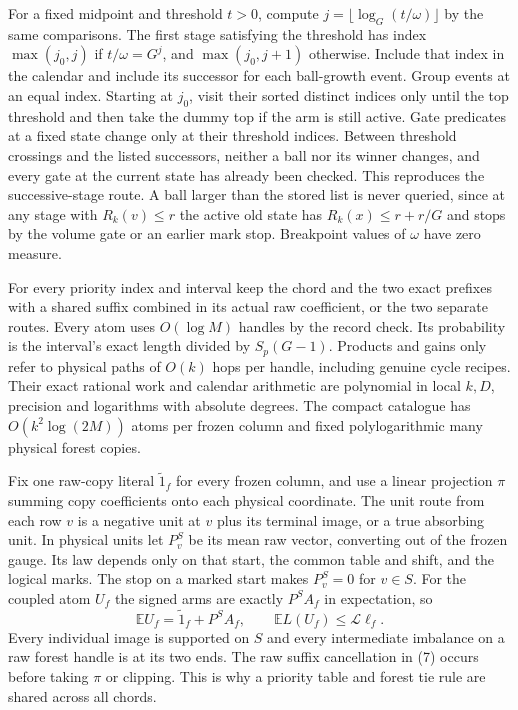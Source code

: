 \documentclass[11pt]{article}
\begin{document}
For a fixed midpoint and threshold \(t>0\), compute \(j=\lfloor\log_G(t/\omega)\rfloor\) by the same comparisons. The first stage satisfying the threshold has index \(\max(j_0,j)\) if \(t/\omega=G^j\), and \(\max(j_0,j+1)\) otherwise. Include that index in the calendar and include its successor for each ball-growth event. Group events at an equal index. Starting at \(j_0\), visit their sorted distinct indices only until the top threshold and then take the dummy top if the arm is still active. Gate predicates at a fixed state change only at their threshold indices. Between threshold crossings and the listed successors, neither a ball nor its winner changes, and every gate at the current state has already been checked. This reproduces the successive-stage route. A ball larger than the stored list is never queried, since at any stage with \(R_k(v)\le r\) the active old state has \(R_k(x)\le r+r/G\) and stops by the volume gate or an earlier mark stop. Breakpoint values of \(\omega\) have zero measure.

For every priority index and interval keep the chord and the two exact prefixes with a shared suffix combined in its actual raw coefficient, or the two separate routes. Every atom uses \(O(\log M)\) handles by the record check. Its probability is the interval's exact length divided by \(S_p(G-1)\). Products and gains only refer to physical paths of \(O(k)\) hops per handle, including genuine cycle recipes. Their exact rational work and calendar arithmetic are polynomial in local \(k,D\), precision and logarithms with absolute degrees. The compact catalogue has \(O(k^2\log(2M))\) atoms per frozen column and fixed polylogarithmic many physical forest copies.

Fix one raw-copy literal \(\widetilde{1}_f\) for every frozen column, and use a linear projection \(\pi\) summing copy coefficients onto each physical coordinate. The unit route from each row \(v\) is a negative unit at \(v\) plus its terminal image, or a true absorbing unit. In physical units let \(P^S_v\) be its mean raw vector, converting out of the frozen gauge. Its law depends only on that start, the common table and shift, and the logical marks. The stop on a marked start makes \(P^S_v=0\) for \(v\in S\). For the coupled atom \(U_f\) the signed arms are exactly \(P^S A_f\) in expectation, so
\[
   \mathbb E U_f=\widetilde{1}_f+P^S A_f,
   \qquad
   \mathbb E L(U_f)\le\mathcal L\ell_f .
\tag{7}
\]
Every individual image is supported on \(S\) and every intermediate imbalance on a raw forest handle is at its two ends. The raw suffix cancellation in (7) occurs before taking \(\pi\) or clipping. This is why a priority table and forest tie rule are shared across all chords.
\end{document}
